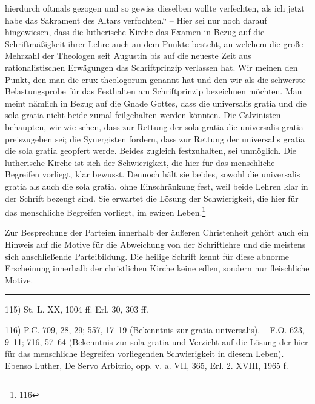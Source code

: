 hierdurch oftmals gezogen und so gewiss dieselben wollte verfechten, als ich jetzt habe das Sakrament des Altars verfochten.“ – Hier sei nur noch darauf hingewiesen, dass die lutherische Kirche das Examen in Bezug auf die Schriftmäßigkeit ihrer Lehre auch an dem Punkte besteht, an welchem die große Mehrzahl der Theologen seit Augustin bis auf die neueste Zeit aus rationalistischen Erwägungen das Schriftprinzip verlassen hat. Wir meinen den Punkt, den man die \foreignlanguage{latin}{crux theologorum} genannt hat und den wir als die schwerste Belastungsprobe für das Festhalten am Schriftprinzip bezeichnen möchten. Man meint nämlich in Bezug auf die Gnade Gottes, dass die \foreignlanguage{latin}{universalis gratia} und die \foreignlanguage{latin}{sola gratia} nicht beide zumal feilgehalten werden könnten. Die Calvinisten behaupten, wir wie sehen, dass zur Rettung der \foreignlanguage{latin}{sola gratia} die \foreignlanguage{latin}{universalis gratia} preiszugeben sei; die Synergisten fordern, dass zur Rettung der \foreignlanguage{latin}{universalis gratia} die \foreignlanguage{latin}{sola gratia} geopfert werde. Beides zugleich festzuhalten, sei unmöglich. Die lutherische Kirche ist sich der Schwierigkeit, die hier für das menschliche Begreifen vorliegt, klar bewusst. Dennoch hält sie beides, sowohl die \foreignlanguage{latin}{universalis gratia} als auch die \foreignlanguage{latin}{sola gratia}, ohne Einschränkung fest, weil beide Lehren klar in der Schrift bezeugt sind. Sie erwartet die Lösung der Schwierigkeit, die hier für das menschliche Begreifen vorliegt, im ewigen Leben.\footnote{116}\par Zur Besprechung der Parteien innerhalb der äußeren Christenheit gehört auch ein Hinweis auf die Motive für die Abweichung von der Schriftlehre und die meistens sich anschließende Parteibildung. Die heilige Schrift kennt für diese abnorme Erscheinung innerhalb der christlichen Kirche keine edlen, sondern nur fleischliche Motive.\par\vfill\noindent\rule{\textwidth}{0.4pt}\vspace{0.2ex}\noindent\hspace*{0cm}\footnotesize{115) St. L. XX, 1004 ff. Erl. 30, 303 ff.}\par\hspace*{0cm}\footnotesize{116) P.C. 709, 28, 29; 557, 17--19 (Bekenntnis zur gratia universalis). -- F.O. 623, 9--11; 716, 57--64 (Bekenntnis zur sola gratia und Verzicht auf die Lösung der hier für das menschliche Begreifen vorliegenden Schwierigkeit in diesem Leben). Ebenso Luther, De Servo Arbitrio, opp. v. a. VII, 365, Erl. 2. XVIII, 1965 f.}